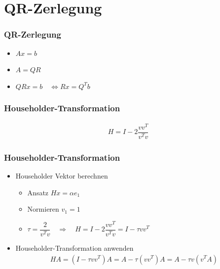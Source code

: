\section{QR-Zerlegung}
\begin{frame}
	\frametitle{QR-Zerlegung}
	\vspace{-0cm}
	\begin{itemize}
		\item $ Ax = b $
		\item $ A = QR $
		\item $ QRx=b \quad \Longleftrightarrow Rx=Q^Tb $
	\end{itemize}
\end{frame}

\begin{frame}
	\frametitle{Householder-Transformation}
	\vspace{-1cm}
	\begin{align*}
		H = I - 2 \dfrac{vv^T}{v^Tv}
	\end{align*}
	\centering
	\scalebox{.8}{}

\end{frame}

\begin{frame}
	\frametitle{Householder-Transformation}
	\vspace{-1cm}
	\begin{itemize}
	\item Householder Vektor berechnen\\
		\begin{itemize}
			\item Ansatz $ Hx = \alpha e_1 $
			\item Normieren $ v_1 = 1 $
			\item $ \tau = \dfrac{2}{v^Tv} \quad \Longrightarrow \quad H = I - 2 \dfrac{vv^T}{v^Tv} = I - \tau vv^T$
		\end{itemize}
		

	\item  Householder-Transformation anwenden
		\begin{align*} 
		H A =(I - \tau vv^T) A= A - \tau (vv^T )A = A - \tau v(v^TA)
		\end{align*}
	\end{itemize}
\end{frame}

